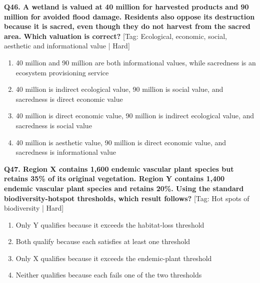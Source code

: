 \noindent\textbf{Q46. A wetland is valued at 40 million for harvested products and 90 million for avoided flood damage. Residents also oppose its destruction because it is sacred, even though they do not harvest from the sacred area. Which valuation is correct?} \hfill [Tag: Ecological, economic, social, aesthetic and informational value | Hard]
\begin{enumerate}[label=(\alph*),topsep=2pt,itemsep=1pt,partopsep=0pt,parsep=0pt]
    \item {40 million and 90 million are both informational values, while sacredness is an ecosystem provisioning service}
    \item {40 million is indirect ecological value, 90 million is social value, and sacredness is direct economic value}
    \item {40 million is direct economic value, 90 million is indirect ecological value, and sacredness is social value}
    \item {40 million is aesthetic value, 90 million is direct economic value, and sacredness is informational value}
\end{enumerate}
\vspace{2mm}

\noindent\textbf{Q47. Region X contains 1,600 endemic vascular plant species but retains 35\% of its original vegetation. Region Y contains 1,400 endemic vascular plant species and retains 20\%. Using the standard biodiversity-hotspot thresholds, which result follows?} \hfill [Tag: Hot spots of biodiversity | Hard]
\begin{enumerate}[label=(\alph*),topsep=2pt,itemsep=1pt,partopsep=0pt,parsep=0pt]
    \item {Only Y qualifies because it exceeds the habitat-loss threshold}
    \item {Both qualify because each satisfies at least one threshold}
    \item {Only X qualifies because it exceeds the endemic-plant threshold}
    \item {Neither qualifies because each fails one of the two thresholds}
\end{enumerate}
\vspace{2mm}

